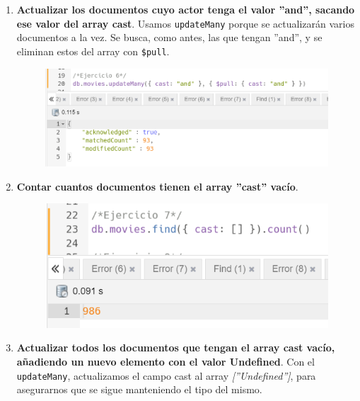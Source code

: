 \documentclass[a4paper,onecolumn]{article}
\begin{document}
\begin{sloppypar}
\begin{enumerate}
\begin{center}
\begin{figure}[H]
        \end{figure}
    \end{center}
    \item \textbf{Actualizar los documentos cuyo actor tenga el valor ''and'', sacando ese valor del array cast}. Usamos \texttt{updateMany} porque se actualizarán
    varios documentos a la vez. Se busca, como antes, las que tengan ''and'', y se eliminan estos del array con \texttt{\$pull}.
    \begin{center}
        \begin{figure}[h!]
            \includegraphics[width=\textwidth]{querys/6.png}
        \end{figure}
    \end{center}
\newpage
\item \textbf{Contar cuantos documentos tienen el array ''cast'' vacío}.
    \begin{center}
        \begin{figure}[h!]
            \includegraphics[width=\textwidth]{querys/7.png}
        \end{figure}
    \end{center}
    \item \textbf{Actualizar todos los documentos que tengan el array cast vacío, añadiendo un nuevo elemento con el valor Undefined}. Con el \texttt{updateMany},
    actualizamos el campo cast al array \textit{[''Undefined'']}, para asegurarnos que se sigue manteniendo el tipo del mismo.
    \begin{center}

\end{center}
\end{enumerate}
\end{sloppypar}
\end{document}
